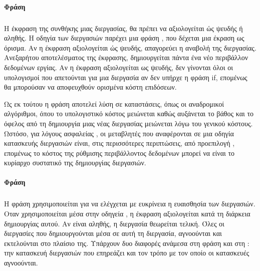 \paragraph{Φράση }
\subparagraph{}
Η έκφραση της συνθήκης \emph{} μιας διεργασίας, θα πρέπει να αξιολογείται ώς ψευδής ή αληθής. 
Η οδηγία των διεργασιών παρέχει μια φράση \emph{}, που δέχεται μια έκραση ως όρισμα. Αν η έκφραση αξιολογείται ώς ψευδής, απαγορεύει η αναβολή της διεργασίας.
Ανεξαρήτου αποτελέσματος της έκφρασης, δημιουργείται πάντα ένα νέο περιβάλλον δεδομένων εργίας. Αν η έκφραση αξιολογείται ως ψευδής, δεν γίνονται όλοι οι υπολογισμοί που απετούνται για μια διεργασία αν δεν υπήρχε η φράση if, επομένως θα μπορούσαν να αποφευχθούν ορισμένα κόστη επιδόσεων.

Ως εκ τούτου η φράση \emph{} αποτελεί λύση σε καταστάσεις, όπως οι αναδρομικοί αλγόριθμοι, όπου
το υπολογιστικό κόστος μειώνεται καθώς αυξάνεται το βάθος και το όφελος από τη δημιουργία μιας νέας διεργασίας
μειώνεται λόγω του γενικού κόστους.
Ωστόσο, για λόγους ασφαλείας \cite{parallel_dist}, οι μεταβλητές που αναφέρονται σε μια οδηγία κατασκευής διεργασιών είναι, στις περισσότερες περιπτώσεις, από προεπιλογή \emph{}, επομένως το κόστος
της ρύθμισης περιβάλλοντος δεδομένων μπορεί να είναι το κυρίαρχο συστατικό της δημιουργίας διεργασιών.

\paragraph{Φράση }
\subparagraph{}
Η φράση χρησιμοποιείται για να ελέγχεται με ευκρίνεια η ευαισθησία των διεργασιών. Οταν χρησιμοποιείται μέσα στην οδηγεία \emph{}, η έκφραση αξιολογείται κατά τη διάρκεια δημιουργίας αυτού.  Αν είναι αληθής, η διεργασία θεωρείται τελική. Όλες οι διεργασίες που δημιουργούνται μέσα σε αυτή τη διεργασία, αγνοούνται και εκτελούνται στο πλαίσιο της.
\clearpage
Υπάρχουν δυο διαφορές ανάμεσα στη φράση \emph{} και στη \emph{}: την κατασκευή διεργασιών που επηρεάζει και τον τρόπο με τον οποίο οι κατασκευές αγνοούνται\cite{tasking1}.

